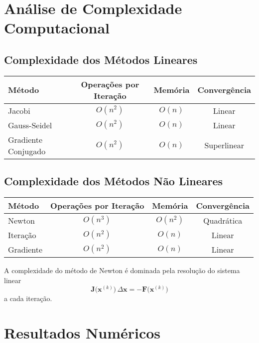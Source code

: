 \documentclass[12pt,a4paper]{article}
\begin{document}
\section{Análise de Complexidade Computacional}

\subsection{Complexidade dos Métodos Lineares}

\begin{center}
\begin{tabular}{lccc}
\hline
\textbf{Método} & \textbf{Operações por Iteração} & \textbf{Memória} & \textbf{Convergência} \\
\hline
Jacobi & $O(n^2)$ & $O(n)$ & Linear \\
Gauss-Seidel & $O(n^2)$ & $O(n)$ & Linear \\
Gradiente Conjugado & $O(n^2)$ & $O(n)$ & Superlinear \\
\hline
\end{tabular}
\end{center}

\subsection{Complexidade dos Métodos Não Lineares}

\begin{center}
\begin{tabular}{lccc}
\hline
\textbf{Método} & \textbf{Operações por Iteração} & \textbf{Memória} & \textbf{Convergência} \\
\hline
Newton & $O(n^3)$ & $O(n^2)$ & Quadrática \\
Iteração & $O(n^2)$ & $O(n)$ & Linear \\
Gradiente & $O(n^2)$ & $O(n)$ & Linear \\
\hline
\end{tabular}
\end{center}

A complexidade do método de Newton é dominada pela resolução do sistema linear
\[
\mathbf{J}\big(\mathbf{x}^{(k)}\big)\,\Delta\mathbf{x} = -\mathbf{F}\big(\mathbf{x}^{(k)}\big)
\]
a cada iteração.








\section{Resultados Numéricos}
\end{document}
